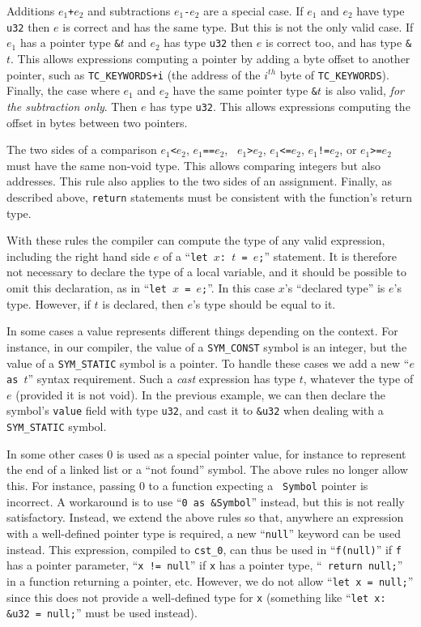 Additions {\tt $e_1$+$e_2$} and subtractions {\tt $e_1$-$e_2$} are a special
case. If $e_1$ and $e_2$ have type {\tt u32} then $e$ is correct and has the
same type. But this is not the only valid case. If $e_1$ has a pointer type
{\tt \&$t$} and $e_2$ has type {\tt u32} then $e$ is correct too, and has type
{\tt \&$t$}. This allows expressions computing a pointer by adding a byte
offset to another pointer, such as {\tt TC\_KEYWORDS+i} (the address of the
$i^{th}$ byte of {\tt TC\_KEYWORDS}). Finally, the case where $e_1$ and $e_2$
have the same pointer type {\tt \&$t$} is also valid, {\em for the subtraction
only}. Then $e$ has type {\tt u32}. This allows expressions computing the
offset in bytes between two pointers.

The two sides of a comparison {\tt $e_1$<$e_2$}, {\tt $e_1$==$e_2$}, {\tt
$e_1$>$e_2$}, {\tt $e_1$<=$e_2$}, {\tt $e_1$!=$e_2$}, or {\tt $e_1$>=$e_2$}
must have the same non-void type. This allows comparing integers but also
addresses. This rule also applies to the two sides of an assignment. Finally,
as described above, {\tt return} statements must be consistent with the
function's return type.

With these rules the compiler can compute the type of any valid expression,
including the right hand side $e$ of a ``{\tt let $x$: $t$ = $e$;}'' statement.
It is therefore not necessary to declare the type of a local variable, and it
should be possible to omit this declaration, as in ``{\tt let $x$ = $e$;}''. In
this case $x$'s ``declared type'' is $e$'s type. However, if $t$ is declared,
then $e$'s type should be equal to it.

In some cases a value represents different things depending on the context. For
instance, in our compiler, the value of a {\tt SYM\_CONST} symbol is an
integer, but the value of a {\tt SYM\_STATIC} symbol is a pointer. To handle
these cases we add a new ``{\tt $e$ as $t$}'' syntax requirement. Such a {\em
cast} expression has type $t$, whatever the type of $e$ (provided it is not
void). In the previous example, we can then declare the symbol's {\tt value}
field with type {\tt u32}, and cast it to {\tt \&u32} when dealing with a {\tt
SYM\_STATIC} symbol.

In some other cases 0 is used as a special pointer value, for instance to
represent the end of a linked list or a ``not found'' symbol. The above rules
no longer allow this. For instance, passing 0 to a function expecting a {\tt
Symbol} pointer is incorrect. A workaround is to use ``{\tt 0 as \&Symbol}''
instead, but this is not really satisfactory. Instead, we extend the above
rules so that, anywhere an expression with a well-defined pointer type is
required, a new ``{\tt null}'' keyword can be used instead. This expression,
compiled to {\tt cst\_0}, can thus be used in ``{\tt f(null)}'' if {\tt f} has
a pointer parameter, ``{\tt x != null}'' if {\tt x} has a pointer type, ``{\tt
return null;}'' in a function returning a pointer, etc. However, we do not
allow ``{\tt let x = null;}'' since this does not provide a well-defined type
for {\tt x} (something like ``{\tt let x: \&u32 = null;}'' must be used
instead).

